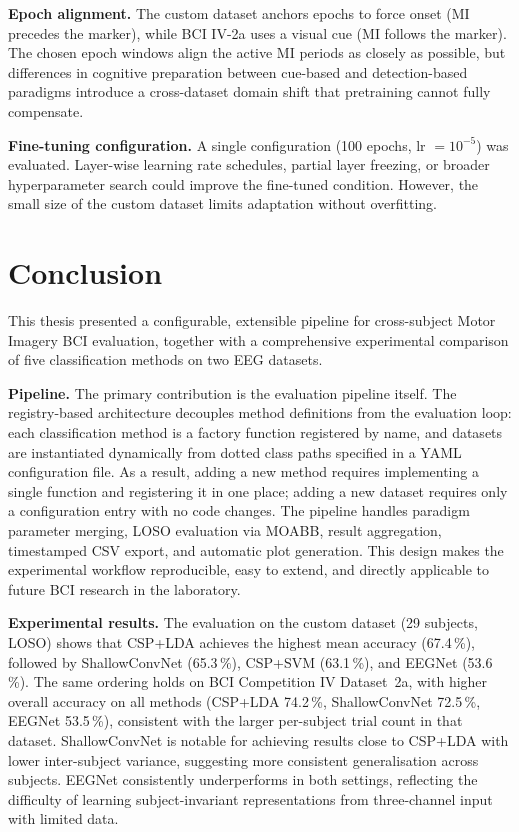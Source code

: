 \documentclass[english, bc, kiv, he, iso690alph, pdf]{fasthesis}
\begin{document}
\textbf{Epoch alignment.} The custom dataset anchors epochs to force onset (MI precedes the marker), while BCI IV-2a uses a visual cue (MI follows the marker). The chosen epoch windows align the active MI periods as closely as possible, but differences in cognitive preparation between cue-based and detection-based paradigms introduce a cross-dataset domain shift that pretraining cannot fully compensate.

\textbf{Fine-tuning configuration.} A single configuration (100 epochs, lr $= 10^{-5}$) was evaluated. Layer-wise learning rate schedules, partial layer freezing, or broader hyperparameter search could improve the fine-tuned condition. However, the small size of the custom dataset limits adaptation without overfitting.

\chapter{Conclusion}

This thesis presented a configurable, extensible pipeline for cross-subject Motor Imagery BCI evaluation, together with a comprehensive experimental comparison of five classification methods on two EEG datasets.

\textbf{Pipeline.} The primary contribution is the evaluation pipeline itself. The registry-based architecture decouples method definitions from the evaluation loop: each classification method is a factory function registered by name, and datasets are instantiated dynamically from dotted class paths specified in a YAML configuration file. As a result, adding a new method requires implementing a single function and registering it in one place; adding a new dataset requires only a configuration entry with no code changes. The pipeline handles paradigm parameter merging, LOSO evaluation via MOABB, result aggregation, timestamped CSV export, and automatic plot generation. This design makes the experimental workflow reproducible, easy to extend, and directly applicable to future BCI research in the laboratory.

\textbf{Experimental results.} The evaluation on the custom dataset (29 subjects, LOSO) shows that CSP+LDA achieves the highest mean accuracy (67.4\,\%), followed by ShallowConvNet (65.3\,\%), CSP+SVM (63.1\,\%), and EEGNet (53.6\,\%). The same ordering holds on BCI Competition IV Dataset~2a, with higher overall accuracy on all methods (CSP+LDA 74.2\,\%, ShallowConvNet 72.5\,\%, EEGNet 53.5\,\%), consistent with the larger per-subject trial count in that dataset. ShallowConvNet is notable for achieving results close to CSP+LDA with lower inter-subject variance, suggesting more consistent generalisation across subjects. EEGNet consistently underperforms in both settings, reflecting the difficulty of learning subject-invariant representations from three-channel input with limited data.
\end{document}
